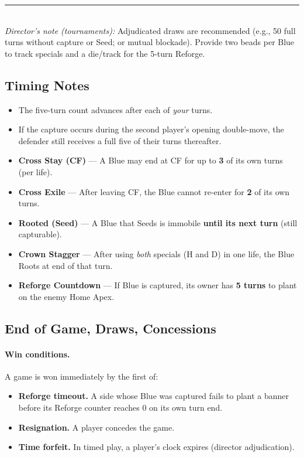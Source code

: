 \documentclass[11pt]{article}
\begin{document}
\noindent\rule{\linewidth}{0.4pt}\\
\small\emph{Director’s note (tournaments):} Adjudicated draws are recommended (e.g., 50 full turns without capture or Seed; or mutual blockade). Provide two beads per Blue to track specials and a die/track for the 5-turn Reforge.

\subsection*{Timing Notes}
\begin{itemize}
  \item The five-turn count advances after each of \emph{your} turns.
  \item If the capture occurs during the second player’s opening double-move, the defender still receives a full five of their turns thereafter.
\end{itemize}

\begin{tcolorbox}[enhanced,title={Five Clocks (Summary)},colback=white,colframe=royal]
\label{tbl:five-clocks}
\small
\begin{itemize}\itemsep0.2em
  \item \textbf{Cross Stay (CF)} — A Blue may end at CF for up to \textbf{3} of its own turns (per life).
  \item \textbf{Cross Exile} — After leaving CF, the Blue cannot re-enter for \textbf{2} of its own turns.
  \item \textbf{Rooted (Seed)} — A Blue that Seeds is immobile \textbf{until its next turn} (still capturable).
  \item \textbf{Crown Stagger} — After using \emph{both} specials (H and D) in one life, the Blue Roots at end of that turn.
  \item \textbf{Reforge Countdown} — If Blue is captured, its owner has \textbf{5 turns} to plant on the enemy Home Apex.
\end{itemize}
\end{tcolorbox}


\subsection{End of Game, Draws, Concessions}
\label{sec:endgame}

\paragraph{Win conditions.}
A game is won immediately by the first of:
\begin{itemize}[leftmargin=1.3em,itemsep=0.25em]
  \item \textbf{Reforge timeout.} A side whose Blue was captured fails to plant a banner before its Reforge counter reaches 0 on its own turn end.
  \item \textbf{Resignation.} A player concedes the game.
  \item \textbf{Time forfeit.} In timed play, a player’s clock expires (director adjudication).
\end{itemize}
\end{document}
